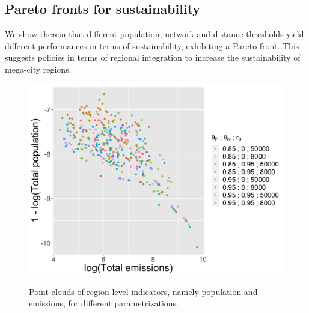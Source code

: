 \documentclass{jimis-en}
\begin{document}










\subsection{Pareto fronts for sustainability}


We show therein that different population, network and distance thresholds yield different performances in terms of sustainability, exhibiting a Pareto front. This suggests policies in terms of regional integration to increase the sustainability of mega-city regions.


\begin{figure}[ht] 
  {\includegraphics[width=\linewidth]{figures/full_effective_pareto.png}}
  \centering
  \label{fig:paretos}
  \caption{Point clouds of region-level indicators, namely population and emissions, for different parametrizations.}
\end{figure}


\end{document}
